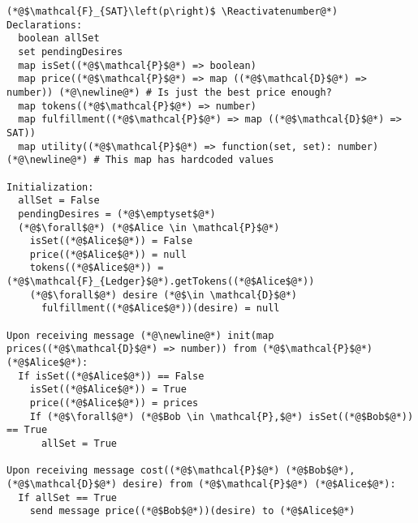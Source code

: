 \Suppressnumber
\begin{lstlisting}[label=satfunc, style=numbers]
(*@$\mathcal{F}_{SAT}\left(p\right)$ \Reactivatenumber@*)
Declarations:
  boolean allSet
  set pendingDesires
  map isSet((*@$\mathcal{P}$@*) => boolean)
  map price((*@$\mathcal{P}$@*) => map ((*@$\mathcal{D}$@*) => number)) (*@\newline@*) # Is just the best price enough?
  map tokens((*@$\mathcal{P}$@*) => number)
  map fulfillment((*@$\mathcal{P}$@*) => map ((*@$\mathcal{D}$@*) => SAT))
  map utility((*@$\mathcal{P}$@*) => function(set, set): number) (*@\newline@*) # This map has hardcoded values

Initialization:
  allSet = False
  pendingDesires = (*@$\emptyset$@*)
  (*@$\forall$@*) (*@$Alice \in \mathcal{P}$@*)
    isSet((*@$Alice$@*)) = False
    price((*@$Alice$@*)) = null
    tokens((*@$Alice$@*)) = (*@$\mathcal{F}_{Ledger}$@*).getTokens((*@$Alice$@*))
    (*@$\forall$@*) desire (*@$\in \mathcal{D}$@*)
      fulfillment((*@$Alice$@*))(desire) = null

Upon receiving message (*@\newline@*) init(map prices((*@$\mathcal{D}$@*) => number)) from (*@$\mathcal{P}$@*) (*@$Alice$@*):
  If isSet((*@$Alice$@*)) == False
    isSet((*@$Alice$@*)) = True
    price((*@$Alice$@*)) = prices
    If (*@$\forall$@*) (*@$Bob \in \mathcal{P},$@*) isSet((*@$Bob$@*)) == True
      allSet = True

Upon receiving message cost((*@$\mathcal{P}$@*) (*@$Bob$@*), (*@$\mathcal{D}$@*) desire) from (*@$\mathcal{P}$@*) (*@$Alice$@*):
  If allSet == True
    send message price((*@$Bob$@*))(desire) to (*@$Alice$@*)


\end{lstlisting}
